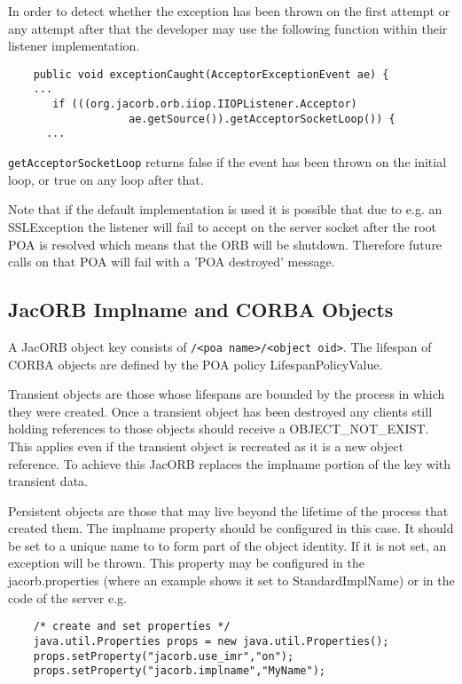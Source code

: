 {{In order to detect whether the exception has been thrown on the first attempt
or any attempt after that the developer may use the following function within
their listener implementation.
\begin{small}
\begin{verbatim}
    public void exceptionCaught(AcceptorExceptionEvent ae) {
    ...
       if (((org.jacorb.orb.iiop.IIOPListener.Acceptor)
                   ae.getSource()).getAcceptorSocketLoop()) {
      ...
\end{verbatim}
\end{small}
{\tt getAcceptorSocketLoop} returns false if the event has been thrown on the
initial loop, or true on any loop after that.

Note that if the default implementation is used it is possible that due to e.g.
an SSLException the listener will fail to accept on the server socket after the
root POA is resolved which means that the ORB will be shutdown. Therefore future
calls on that POA will fail with a 'POA destroyed' message.

\subsection{JacORB Implname and CORBA Objects}
\label{implname}
A JacORB object key consists of {\tt <impl name>/<poa name>/<object oid>}. The lifespan of CORBA objects are defined by the POA policy LifespanPolicyValue.

Transient objects are those whose lifespans are bounded by the process in which they were created. Once a transient object has been destroyed any clients still holding references to those objects should receive a OBJECT\_NOT\_EXIST. This applies even if the transient object is recreated as it is a new object reference. To achieve this JacORB replaces the implname portion of the key with transient data.

Persistent objects are those that may live beyond the lifetime of the process that created them. The implname property should be configured in this case. It should be set to a unique name to to form part of the object identity. If it is not set, an exception will be thrown. This property may be configured in the jacorb.properties (where an example shows it set to StandardImplName) or in the code of the server e.g.
\small{
\begin{verbatim}
    /* create and set properties */
    java.util.Properties props = new java.util.Properties();
    props.setProperty("jacorb.use_imr","on");
    props.setProperty("jacorb.implname","MyName");


\end{verbatim}}}}
